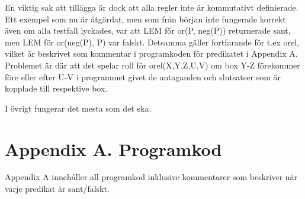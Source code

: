 \documentclass[a4paper]{article}
\begin{document}
En viktig sak att tillägga är dock att alla regler inte är kommutativt definierade. Ett exempel som nu är åtgärdat, men som från början
inte fungerade korrekt även om alla testfall lyckades, var att LEM för or(P, neg(P)) returnerade sant, men LEM för or(neg(P), P) var falskt. Detsamma gäller fortfarande för t.ex orel, vilket är beskrivet som kommentar i programkoden för predikatet i Appendix A. Problemet är där att
det spelar roll för orel(X,Y,Z,U,V) om box Y-Z förekommer före eller efter U-V i programmet givet de antaganden och slutsatser som är kopplade till respektive box.

I övrigt fungerar det mesta som det ska.
\newpage
\section{Appendix A. Programkod}
Appendix A innehåller all programkod inklusive kommentarer som beskriver när varje predikat är sant/falskt.
\end{document}
